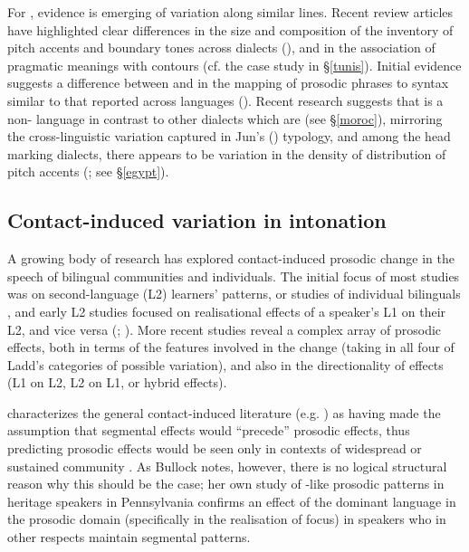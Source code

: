 \documentclass[output=paper]{langsci/langscibook}
\begin{document}
For , evidence is emerging of variation along similar lines. Recent review articles have highlighted clear differences in the size and composition of the inventory of pitch accents and boundary tones across  dialects (\citealt{Chahal2011,ElZarka2017}), and in the association of pragmatic meanings with contours (cf. the case study in §\ref{tunis}). Initial evidence suggests a difference between  and  in the mapping of prosodic phrases to syntax \citep{Hellmuth2016} similar to that reported across  languages (\citealt{Dimperioetal2005}). Recent research suggests that  is a non- language in contrast to other  dialects which are  (see §\ref{moroc}), mirroring the cross-linguistic variation captured in Jun's (\citeyear{Jun2005}) typology, and among the head marking dialects, there appears to be variation in the density of distribution  of pitch accents (\citealt{ChahalHellmuth2015}; see §\ref{egypt}).


 
 \subsection{Contact-induced variation in intonation} \label{var}


A growing body of research has explored contact-induced prosodic change in the speech of bilingual communities and individuals. The initial focus of most studies was on second-language (L2) learners’  patterns, or studies of individual bilinguals \citep{Queen2012}, and early L2 studies focused on realisational effects of a speaker’s L1 on their L2, and vice versa (\citealt{AttererLadd2004}; \citealt{Mennen2004}). More recent studies reveal a complex array of prosodic effects, both in terms of the features involved in the change (taking in all four of Ladd’s categories of possible variation), and also in the directionality of effects (L1 on L2, L2 on L1, or hybrid effects). 

\citet{Bullock2009} characterizes the general contact-induced  literature (e.g. \citealt{WeinreichLabovHerzog1968,ThomasonKaufman1988}) as having made the assumption that segmental effects would ``precede'' prosodic effects, thus predicting prosodic effects would be seen only in contexts of widespread or sustained community . As Bullock notes, however, there is no logical structural reason why this should be the case; her own study of -like prosodic patterns in heritage  speakers in Pennsylvania confirms an effect of the dominant language in the prosodic domain (specifically in the realisation of focus) in speakers who in other respects maintain  segmental patterns.
\end{document}
